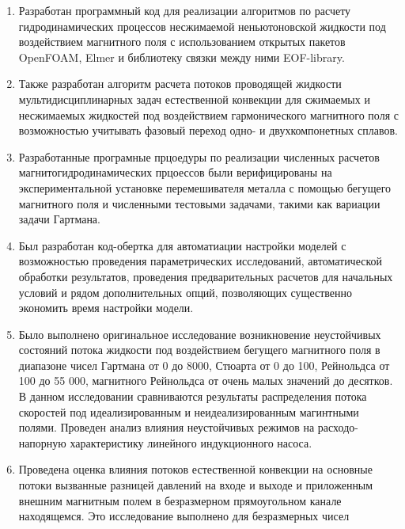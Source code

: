 {\novelty}
\begin{enumerate}[beginpenalty=10000] %
  
  \item Разработан программный код для реализации алгоритмов по расчету гидродинамических процессов  несжимаемой неньютоновской жидкости под воздействием магнитного поля с использованием открытых пакетов OpenFOAM, Elmer и библиотеку связки между ними EOF-library.
    
  \item Также разработан алгоритм расчета потоков проводящей жидкости мультидисциплинарных задач естественной конвекции для сжимаемых и несжимаемых жидкостей под воздействием гармонического магнитного поля с возможностью учитывать фазовый переход одно- и двухкомпонетных сплавов. 
  
  \item Разработанные програмные прцоедуры по реализации численных расчетов магнитогидродинамических прцоессов были верифицированы на экспериментальной установке перемешивателя металла с помощью бегущего магнитного поля и численными тестовыми задачами, такими как вариации задачи Гартмана. 
  
  \item Был разработан код-обертка для автоматиации настройки моделей с возможностью проведения параметрических исследований, автоматической обработки результатов, проведения предварительных расчетов для начальных условий и рядом дополнительных опций, позволяющих существенно экономить время настройки модели. 
    
  \item Было выполнено оригинальное исследование возникновение неустойчивых состояний потока жидкости под воздействием бегущего магнитного поля 
  в диапазоне чисел Гартмана от 0 до 8000, Стюарта от 0 до 100, Рейнольдса от 100 до 55 000, магнитного Рейнольдса от очень малых значений до десятков. В данном исследовании сравниваются результаты распределения потока скоростей под идеализированным и неидеализированным магинтными полями. Проведен анализ влияния неустойчивых режимов на расходо-напорную характеристику линейного индукционного насоса. 
  
  \item Проведена оценка влияния потоков естественной конвекции на основные потоки вызванные разницей давлений на входе и выходе и приложенным внешним магнитным полем в безразмерном прямоугольном канале находящемся. Это исследование выполнено для безразмерных чисел  
  
   
\end{enumerate}

